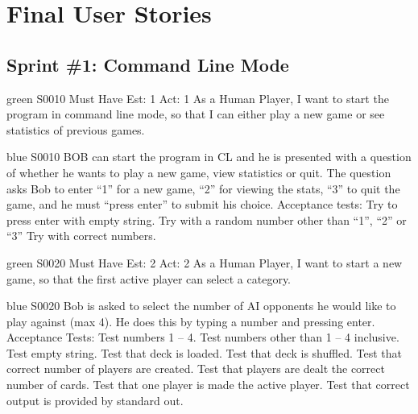 \newpage
\section{Final User Stories}


\subsection{Sprint \#1: Command Line Mode} 
\label{appendix:user_stories_command_line}
\bigskip


\begin{card}{green}
{S0010}
{Must Have}
{Est: 1}
{Act: 1}
As a Human Player, I want to start the program in command line mode, so that I can either play a new game or see statistics of previous games.
\end{card}

\begin{card}{blue}
{S0010}{}{}{}
BOB can start the program in CL and he is presented with a question of whether he wants to play a new game, view statistics or quit. 
The question asks Bob to enter ``1'' for a new game, ``2'' for viewing the stats, ``3'' to quit the game, and he must ``press enter'' to submit his choice. Acceptance tests: Try to press enter with empty string. 
Try with a random number other than ``1'', ``2'' or ``3'' Try with correct numbers.
\end{card}


\newpage

\begin{card}{green}
{S0020}
{Must Have}
{Est: 2}
{Act: 2}
As a Human Player, I want to start a new game, so that the first active player can select a category.
\end{card}

\begin{card}{blue}
{S0020}{}{}{}
Bob is asked to select the number of AI opponents he would like to play against (max 4). 
He does this by typing a number and pressing enter. 
Acceptance Tests: Test numbers 1 – 4. 
Test numbers other than 1 – 4 inclusive. 
Test empty string. 
Test that deck is loaded. 
Test that deck is shuffled. 
Test that correct number of players are created. 
Test that players are dealt the correct number of cards. 
Test that one player is made the active player. 
Test that correct output is provided by standard out.
\end{card}

